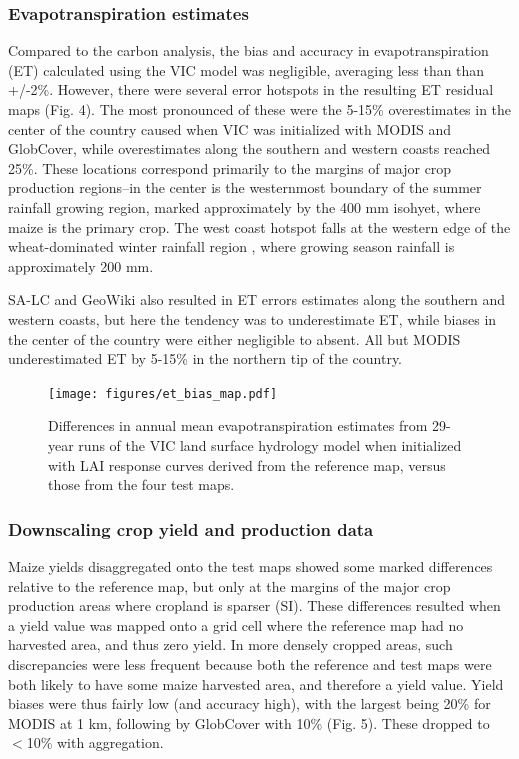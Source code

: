 \documentclass[a4paper]{article}
\begin{document}
\subsubsection*{Evapotranspiration estimates}
\vspace{-0.2 cm}
Compared to the carbon analysis, the bias and accuracy in evapotranspiration (ET) calculated using the VIC model was negligible, averaging less than than +/-2\%. However, there were several error hotspots in the resulting ET residual maps (Fig. 4). The most pronounced of these were the 5-15\% overestimates in the center of the country caused when VIC was initialized with MODIS and GlobCover, while overestimates along the southern and western coasts reached 25\%. These locations correspond primarily to the margins of major crop production regions--in the center is the westernmost boundary of the summer rainfall growing region, marked approximately by the 400 mm isohyet, where maize is the primary crop. The west coast hotspot falls at the western edge of the wheat-dominated winter rainfall region \citep{hardy_rainfed_2011}, where growing season rainfall is approximately 200 mm. 

SA-LC and GeoWiki also resulted in ET errors estimates along the southern and western coasts, but here the tendency was to underestimate ET, while biases in the center of the country were either negligible to absent.  All but MODIS underestimated ET by 5-15\% in the northern tip of the country.  

\begin{figure}[h]
\centerline{\texttt{[image: figures/et\_bias\_map.pdf]}}
\caption{Differences in annual mean evapotranspiration estimates from 29-year runs of the VIC land surface hydrology model when initialized with LAI response curves derived from the reference map, versus those from the four test maps.}\label{afoto}
\end{figure}

\vspace{-0.3 cm}
\subsubsection*{Downscaling crop yield and production data}
\vspace{-0.2 cm}
Maize yields disaggregated onto the test maps showed some marked differences relative to the reference map, but only at the margins of the major crop production areas where cropland is sparser (SI). These differences resulted when a yield value was mapped onto a grid cell where the reference map had no harvested area, and thus zero yield. In more densely cropped areas, such discrepancies were less frequent because both the reference and test maps were both likely to have some maize harvested area, and therefore a yield value.  Yield biases were thus fairly low (and accuracy high), with the largest being 20\% for MODIS at 1 km, following by GlobCover with 10\% (Fig. 5). These dropped to $<$10\% with aggregation.  
\end{document}
